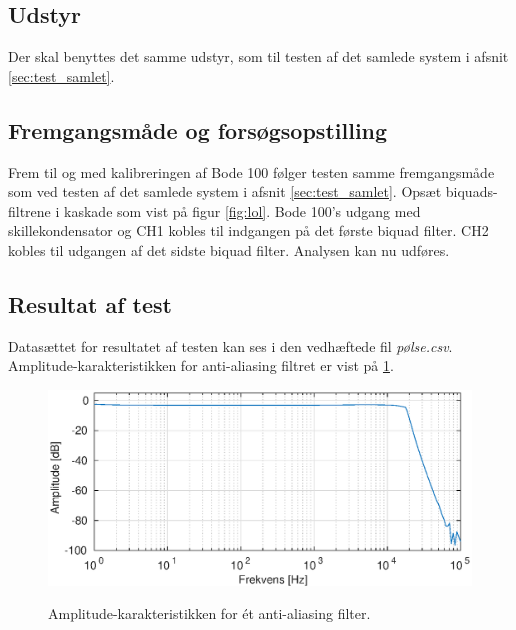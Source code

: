 \subsection{Udstyr}
Der skal benyttes det samme udstyr, som til testen af det samlede system i afsnit \ref{sec:test_samlet}.

\subsection{Fremgangsmåde og forsøgsopstilling}
Frem til og med kalibreringen af Bode 100 følger testen samme fremgangsmåde som ved testen af det samlede system i afsnit \ref{sec:test_samlet}. \newline
Opsæt biquads-filtrene i kaskade som vist på figur \ref{fig:lol}. 
Bode 100's udgang med skillekondensator og CH1 kobles til indgangen på det første biquad filter. 
CH2 kobles til udgangen af det sidste biquad filter. \newline
Analysen kan nu udføres. 

\subsection{Resultat af test}
Datasættet for resultatet af testen kan ses i den vedhæftede fil \textit{pølse.csv}. Amplitude-karakteristikken for anti-aliasing filtret er vist på \ref{fig:tf_filter}. 
\begin{figure}[h]
	\caption{Amplitude-karakteristikken for ét anti-aliasing filter.}
	\includegraphics[width=1\linewidth]{./billeder/tf_filter.eps}
	\label{fig:tf_filter}
\end{figure}